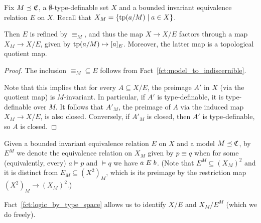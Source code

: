 	
	\begin{fct}
		\label{fct:logic_by_type_space}
		Fix $M\preceq {\mathfrak C}$, a $\emptyset$-type-definable set $X$ and a bounded invariant equivalence relation $E$ on $X$. Recall that $X_M=\{\operatorname{{tp}}(a/M)\mid a\in X \}$.
		
		Then $E$ is refined by $\equiv_M$, and thus the map $X\to X/E$ factors through a map $X_M\to X/E$, given by $\operatorname{{tp}}(a/M)\mapsto [a]_E$. Moreover, the latter map is a topological quotient map.
	\end{fct}
	\begin{proof}
		The inclusion ${\equiv_M}\subseteq E$ follows from Fact~\ref{fct:model_to_indiscernible}.
		
		Note that this implies that for every $A\subseteq X/E$, the preimage $A'$ in $X$ (via the quotient map) is $M$-invariant. In particular, if $A'$ is type-definable, it is type-definable over $M$. It follows that $A'_M$, the preimage of $A$ via the induced map $X_M\to X/E$, is also closed. Conversely, if $A'_M$ is closed, then $A'$ is type-definable, so $A$ is closed.
	\end{proof}
	
	\begin{dfn}
		\label{dfn:EM}
		Given a bounded invariant equivalence relation $E$ on $X$ and a model $M\preceq {\mathfrak C}$, by $E^M$ we denote the equivalence relation on $X_M$ given by $p\equiv q$ when for some (equivalently, every) $a\models p$ and $\models q$ we have $a\mathrel{E} b$. (Note that $E^M\subseteq (X_M)^2$ and it is distinct from $E_M\subseteq (X^2)_M$, which is its preimage by the restriction map $(X^2)_M\to (X_M)^2$.)
		\xqed{\lozenge}
	\end{dfn}
	
	\begin{rem}
		Fact~\ref{fct:logic_by_type_space} allows us to identify $X/E$ and $X_M/E^M$ (which we do freely).\xqed{\lozenge}
	\end{rem}
	
